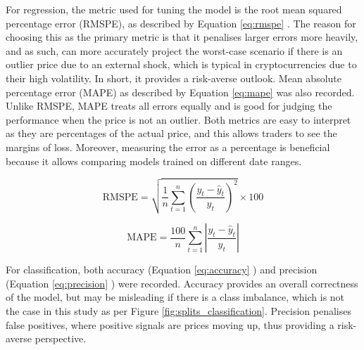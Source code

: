 \documentclass[ %
                    author={Raj Dhakan},
                supervisor={Dr. Ayush Joshi},
                    degree={MSc},
                     title={Ethereum Price Prediction using Internal and External Factors},
                  subtitle={},
                      type={},
                      year={2025}]{dissertation}
\begin{document}
For regression, the metric used for tuning the model is the root mean squared percentage error (RMSPE), as described by Equation \ref{eq:rmspe} \cite{hewamalage2023forecast}. The reason for choosing this as the primary metric is that it penalises larger errors more heavily, and as such, can more accurately project the worst-case scenario if there is an outlier price due to an external shock, which is typical in cryptocurrencies due to their high volatility. In short, it provides a risk-averse outlook. Mean absolute percentage error (MAPE) as described by Equation \ref{eq:mape} \cite{hewamalage2023forecast} was also recorded. Unlike RMSPE, MAPE treats all errors equally and is good for judging the performance when the price is not an outlier. Both metrics are easy to interpret as they are percentages of the actual price, and this allows traders to see the margins of loss. Moreover, measuring the error as a percentage is beneficial because it allows comparing models trained on different date ranges.



\begin{equation}
\label{eq:rmspe}
\text{RMSPE} = \sqrt{ \frac{1}{n} \sum_{t=1}^{n} \left( \frac{y_t - \hat{y}_t}{y_t} \right)^2 } \times 100
\end{equation}

\begin{equation}
\label{eq:mape}
\text{MAPE} = \frac{100}{n} \sum_{t=1}^{n} \left| \frac{y_t - \hat{y}_t}{y_t} \right|
\end{equation}

\vspace{0.25cm}
\vspace{0.5cm}

For classification, both accuracy (Equation \ref{eq:accuracy} \cite{omole2024deep}) and precision (Equation \ref{eq:precision} \cite{omole2024deep}) were recorded. Accuracy provides an overall correctness of the model, but may be misleading if there is a class imbalance, which is not the case in this study as per Figure \ref{fig:splits_classification}. Precision penalises false positives, where positive signals are prices moving up, thus providing a risk-averse perspective.
\end{document}

